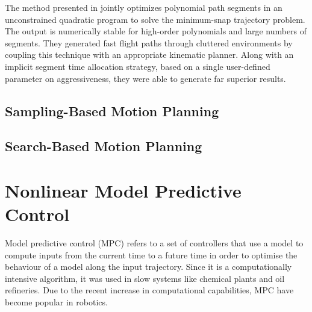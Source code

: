 The method presented in  \cite{richter2016polynomial} jointly optimizes polynomial path segments in an unconstrained quadratic program to solve the minimum-snap trajectory problem. The output is numerically stable for high-order polynomials and large numbers of segments. They generated fast flight paths through cluttered environments by coupling this technique with an appropriate kinematic planner. Along with an implicit segment time allocation strategy, based on a single user-defined parameter on aggressiveness, they were able to generate far superior results.


\subsection{Sampling-Based Motion Planning}

\subsection{Search-Based Motion Planning}


\section{Nonlinear Model Predictive Control}
Model predictive control (MPC) refers to a set of controllers
that use a model to compute inputs from the current time to
a future time in order to optimise the behaviour of a model
along the input trajectory. Since it is a computationally intensive algorithm, it was used in slow systems like chemical plants and oil refineries. Due to the recent increase in computational capabilities, MPC have become popular in robotics. 

